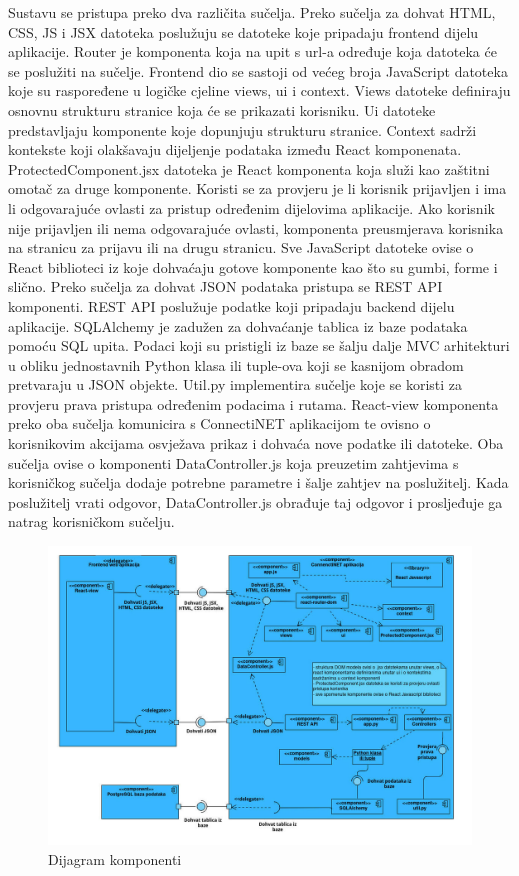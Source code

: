		
			 Sustavu se pristupa preko dva različita sučelja. Preko sučelja za dohvat HTML, CSS, JS i JSX datoteka poslužuju se datoteke koje pripadaju frontend dijelu aplikacije. Router je komponenta koja na upit s url-a određuje koja datoteka će se poslužiti na sučelje. Frontend dio se sastoji od većeg broja JavaScript datoteka koje su raspoređene u logičke cjeline views, ui i context. Views datoteke definiraju osnovnu strukturu stranice koja će se prikazati korisniku. Ui datoteke predstavljaju komponente koje dopunjuju strukturu stranice. Context sadrži kontekste koji olakšavaju dijeljenje podataka između React komponenata. ProtectedComponent.jsx datoteka je React komponenta koja služi kao zaštitni omotač za druge komponente. Koristi se za provjeru je li korisnik prijavljen i ima li odgovarajuće ovlasti za pristup određenim dijelovima aplikacije. Ako korisnik nije prijavljen ili nema odgovarajuće ovlasti, komponenta preusmjerava korisnika na stranicu za prijavu ili na drugu stranicu. Sve JavaScript datoteke ovise o React biblioteci iz koje dohvaćaju gotove komponente kao što su gumbi, forme i slično. Preko sučelja za dohvat JSON podataka pristupa se REST API komponenti. REST API poslužuje podatke koji pripadaju backend dijelu aplikacije. SQLAlchemy je zadužen za dohvaćanje tablica iz baze podataka pomoću SQL upita. Podaci koji su pristigli iz baze se šalju dalje MVC arhitekturi u obliku jednostavnih Python klasa ili tuple-ova koji se kasnijom obradom pretvaraju u JSON objekte. Util.py implementira sučelje koje se koristi za provjeru prava pristupa određenim podacima i rutama. React-view komponenta preko oba sučelja komunicira s ConnectiNET aplikacijom te ovisno o korisnikovim akcijama osvježava prikaz i dohvaća nove podatke ili datoteke. Oba sučelja ovise o komponenti DataController.js koja preuzetim zahtjevima s korisničkog sučelja dodaje potrebne parametre i šalje zahtjev na poslužitelj. Kada poslužitelj vrati odgovor, DataController.js obrađuje taj odgovor i prosljeđuje ga natrag korisničkom sučelju.
			 \begin{figure}[htbp]
				\centering
				\includegraphics[width=1\textwidth]{dijagrami/component_diagram_finally.jpeg}
				\caption{Dijagram komponenti}
			\label{fig:my_image}
			\end{figure}